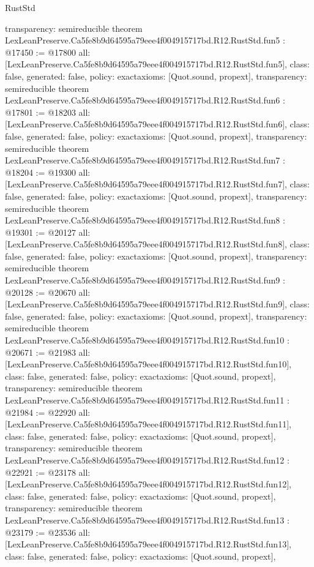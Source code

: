 \begin{lexlean}{RustStd}
\begin{coremodule}
{  transparency: semireducible
}
theorem LexLeanPreserve.Ca5fe8b9d64595a79eee4f004915717bd.R12.RustStd.fun5 : @17450 := @17800 {
  all: [LexLeanPreserve.Ca5fe8b9d64595a79eee4f004915717bd.R12.RustStd.fun5],
  class: false,
  generated: false,
  policy: exact{axioms: [Quot.sound, propext]},
  transparency: semireducible
}
theorem LexLeanPreserve.Ca5fe8b9d64595a79eee4f004915717bd.R12.RustStd.fun6 : @17801 := @18203 {
  all: [LexLeanPreserve.Ca5fe8b9d64595a79eee4f004915717bd.R12.RustStd.fun6],
  class: false,
  generated: false,
  policy: exact{axioms: [Quot.sound, propext]},
  transparency: semireducible
}
theorem LexLeanPreserve.Ca5fe8b9d64595a79eee4f004915717bd.R12.RustStd.fun7 : @18204 := @19300 {
  all: [LexLeanPreserve.Ca5fe8b9d64595a79eee4f004915717bd.R12.RustStd.fun7],
  class: false,
  generated: false,
  policy: exact{axioms: [Quot.sound, propext]},
  transparency: semireducible
}
theorem LexLeanPreserve.Ca5fe8b9d64595a79eee4f004915717bd.R12.RustStd.fun8 : @19301 := @20127 {
  all: [LexLeanPreserve.Ca5fe8b9d64595a79eee4f004915717bd.R12.RustStd.fun8],
  class: false,
  generated: false,
  policy: exact{axioms: [Quot.sound, propext]},
  transparency: semireducible
}
theorem LexLeanPreserve.Ca5fe8b9d64595a79eee4f004915717bd.R12.RustStd.fun9 : @20128 := @20670 {
  all: [LexLeanPreserve.Ca5fe8b9d64595a79eee4f004915717bd.R12.RustStd.fun9],
  class: false,
  generated: false,
  policy: exact{axioms: [Quot.sound, propext]},
  transparency: semireducible
}
theorem LexLeanPreserve.Ca5fe8b9d64595a79eee4f004915717bd.R12.RustStd.fun10 : @20671 := @21983 {
  all: [LexLeanPreserve.Ca5fe8b9d64595a79eee4f004915717bd.R12.RustStd.fun10],
  class: false,
  generated: false,
  policy: exact{axioms: [Quot.sound, propext]},
  transparency: semireducible
}
theorem LexLeanPreserve.Ca5fe8b9d64595a79eee4f004915717bd.R12.RustStd.fun11 : @21984 := @22920 {
  all: [LexLeanPreserve.Ca5fe8b9d64595a79eee4f004915717bd.R12.RustStd.fun11],
  class: false,
  generated: false,
  policy: exact{axioms: [Quot.sound, propext]},
  transparency: semireducible
}
theorem LexLeanPreserve.Ca5fe8b9d64595a79eee4f004915717bd.R12.RustStd.fun12 : @22921 := @23178 {
  all: [LexLeanPreserve.Ca5fe8b9d64595a79eee4f004915717bd.R12.RustStd.fun12],
  class: false,
  generated: false,
  policy: exact{axioms: [Quot.sound, propext]},
  transparency: semireducible
}
theorem LexLeanPreserve.Ca5fe8b9d64595a79eee4f004915717bd.R12.RustStd.fun13 : @23179 := @23536 {
  all: [LexLeanPreserve.Ca5fe8b9d64595a79eee4f004915717bd.R12.RustStd.fun13],
  class: false,
  generated: false,
  policy: exact{axioms: [Quot.sound, propext]},
}
\end{coremodule}
\end{lexlean}
